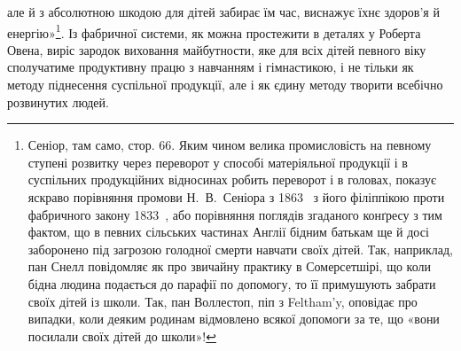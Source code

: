 але й з абсолютною шкодою для дітей забирає їм час, виснажує
їхнє здоров’я й енергію»\footnote{
Сеніор, там само, стор. 66. Яким чином велика промисловість на
певному ступені розвитку через переворот у способі матеріяльної продукції
і в суспільних продукційних відносинах робить переворот і в головах,
показує яскраво порівняння промови Н.~В.~Сеніора з 1863~ з його філіппікою
проти фабричного закону 1833~, або порівняння поглядів згаданого
конґресу з тим фактом, що в певних сільських частинах Англії бідним
батькам ще й досі заборонено під загрозою голодної смерти навчати
своїх дітей. Так, наприклад, пан Снелл повідомляє як про звичайну практику
в Сомерсетшірі, що коли бідна людина подається до парафії
по допомогу, то її примушують забрати своїх дітей із школи. Так, пан
Воллестоп, піп з Feltham’y, оповідає про випадки, коли деяким родинам
відмовлено всякої допомоги за те, що «вони посилали своїх дітей до
школи»!
}. Із фабричної системи, як можна простежити
в деталях у Роберта Овена, виріс зародок виховання
майбутности, яке для всіх дітей певного віку сполучатиме продуктивну
працю з навчанням і гімнастикою, і не тільки як методу
піднесення суспільної продукції, але і як єдину методу творити
всебічно розвинутих людей.

